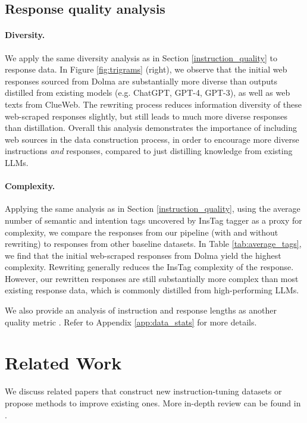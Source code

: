 \subsection{Response quality analysis}\label{response_quality}
\paragraph{Diversity.} We apply the same diversity analysis as in Section \ref{instruction_quality} to response data. In Figure \ref{fig:trigrams} (right), we observe that the initial web responses sourced from Dolma are substantially more diverse than outputs distilled from existing models (e.g. ChatGPT, GPT-4, GPT-3), as well as web texts from ClueWeb. The rewriting process reduces information diversity of these web-scraped responses slightly, but still leads to much more diverse responses than distillation. Overall this analysis demonstrates the importance of including web sources in the data construction process, in order to encourage more diverse instructions \textit{and} responses, compared to just distilling knowledge from existing LLMs. 
\vspace{-0.25em}
\paragraph{Complexity.} 
Applying the same analysis as in Section \ref{instruction_quality}, using the average number of semantic and intention tags uncovered by InsTag tagger \cite{lu2023instag} as a proxy for complexity, we compare the responses from our pipeline (with and without rewriting) to responses from other baseline datasets. In Table \ref{tab:average_tags}, we find that the initial web-scraped responses from Dolma yield the highest complexity. Rewriting generally reduces the InsTag complexity of the response. However, our rewritten responses are still substantially more complex than most existing response data, which is commonly distilled from high-performing LLMs.

We also provide an analysis of instruction and response lengths as another quality metric%
. Refer to Appendix \ref{app:data_stats} for more details.
\vspace{-0.25em}
\section{Related Work}
\vspace{-0.25em}
We discuss related papers that construct new instruction-tuning datasets or propose methods to improve existing ones. More in-depth review can be found in \citet{zhang2023instruction}.
\vspace{-0.25em}
